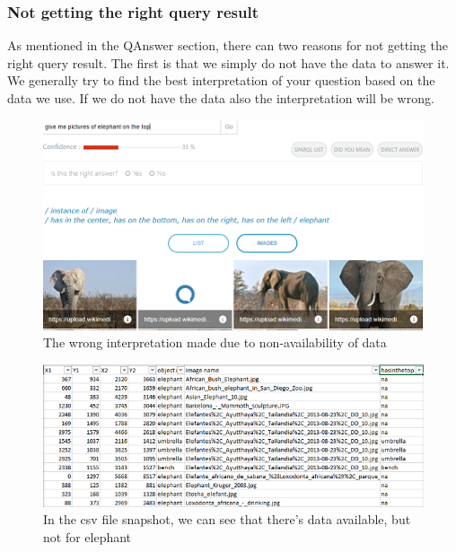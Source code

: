 \documentclass[12pt]{article}
\begin{document}
\subsubsection{Not getting the right query result}
As mentioned in the QAnswer section, there can two reasons for not getting the right query result.  The first is that we simply do not have the data to answer it. We generally try to find the best interpretation of your question based on the data we use. If we do not have the data also the interpretation will be wrong.
\newpage
\begin{figure}
\center  
\includegraphics{QAnswerElephantOnTheTopP.png} 
\caption{The wrong interpretation made due to non-availability of data}
\end{figure}



\begin{figure}
\includegraphics{elephantOnTheTopP.png}
\caption{In the csv file snapshot, we can see that there's data available, but not for elephant}
\end{figure}
\end{document}
